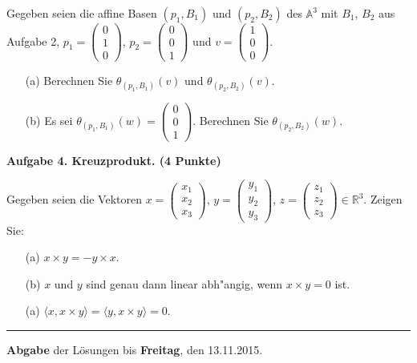 \documentclass[a4paper,12pt]{scrartcl}
\newcommand{\RR}{\mathbb{R}}
\begin{document}
Gegeben seien die affine Basen $(p_1, B_1)$ und $(p_2, B_2)$ des $\mathbb{A}^3$ mit
$B_1$, $B_2$ aus Aufgabe 2, $p_1 = \begin{pmatrix} 0 \\  1 \\ 0 \end{pmatrix}$,  $p_2 = \begin{pmatrix} 0 \\  0 \\ 1 \end{pmatrix}$ und $v= \begin{pmatrix} 1 \\  0 \\ 0 \end{pmatrix}$. 
\begin{itemize}\itemsep0pt
\item[(a)] Berechnen Sie $\theta_{(p_1, B_1)} (v)$ und  $\theta_{(p_2, B_2)}(v)$.
\item[(b)] Es sei $\theta_{(p_1, B_1)} (w) = \begin{pmatrix} 0 \\  0 \\ 1 \end{pmatrix}$. Berechnen Sie   $\theta_{(p_2, B_2)} (w)$.
\end{itemize}



\vspace*{4mm}


{\bf Aufgabe 4. Kreuzprodukt. \hfill (4 Punkte)}

Gegeben seien die Vektoren 
$x=\begin{pmatrix} x_1\\ x_2\\ x_3 \end{pmatrix}$, $y=\begin{pmatrix} y_1\\ y_2\\ y_3 \end{pmatrix}$,  $z=\begin{pmatrix} z_1\\ z_2\\ z_3 \end{pmatrix} \in\RR^3$. Zeigen Sie:
\begin{itemize}
\item [(a)] $x  \times y = -y\times x$.
\item[(b)]
$x$ und $y$ sind genau dann linear abh"angig, wenn $x\times y=0$ ist. 
\item[(a)] $\langle x, x \times y \rangle = \langle y, x\times y \rangle = 0$.  
\end{itemize}

\vspace*{4mm}

\vfill

\hrule
{\bf Abgabe} der L\"osungen  bis  {\bf Freitag}, den 13.11.2015.  
\end{document}

